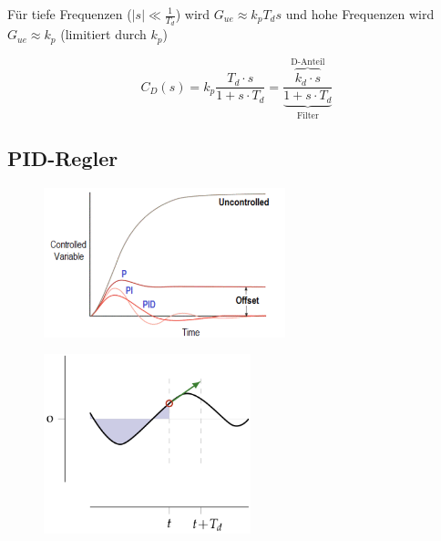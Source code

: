 \documentclass[
  10pt,
  a4paper,
  twocolumn]{article}
\numberwithin{equation}{section}
\begin{document}
\begin{center}
\end{center}

Für tiefe Frequenzen (\(\lvert s\rvert\ll\frac1{T_d}\)) wird
\(G_{ue}\approx k_p T_ds\) und hohe Frequenzen wird
\(G_{ue}\approx k_p\) (limitiert durch \(k_p\))

\[
C_{D}(s)= k_p\frac{T_d\cdot s}{1+s\cdot T_d} = \frac{\overbrace{k_d\cdot s}^{\text{D-Anteil}}}{\underbrace{1+s\cdot T_d}_{\text{Filter}}}
\]

\hypertarget{pid-regler}{%
\subsection{PID-Regler}\label{pid-regler}}

\begin{figure}[H]

{\centering \includegraphics[width=7cm,height=\textheight]{images/pid_regler/PID-Controller-Graph-1906105412.png}

}

\end{figure}

\begin{figure}[H]

{\centering \includegraphics[width=6cm,height=\textheight]{images/pid_regler/pid_graph.png}

}

\end{figure}
\end{document}
